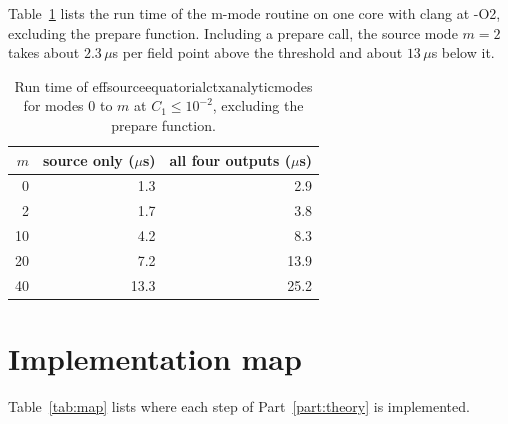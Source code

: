 \documentclass[11pt]{article}
\newcommand{\codeus}{\textunderscore\allowbreak}
\newcommand{\codehy}{-\allowbreak}
\newcommand{\code}[1]{{\ttfamily\let\_\codeus\let\-\codehy #1}}
\begin{document}
Table~\ref{tab:timing} lists the run time of the m-mode routine on one core
with clang at \code{-O2}, excluding the prepare function. Including a prepare
call, the source mode $m=2$ takes about $2.3\,\mu$s per field point above the
threshold and about $13\,\mu$s below it.

\begin{table}[H]
  \centering
  \caption{Run time of \code{effsource\_equatorial\_ctx\_analytic\_modes} for
    modes $0$ to $m$ at $C_1\le10^{-2}$, excluding the prepare function.}
  \label{tab:timing}
  \begin{tabular}{rrr}
    \toprule
    $m$ & source only ($\mu$s) & all four outputs ($\mu$s) \\
    \midrule
    0  & 1.3  & 2.9  \\
    2  & 1.7  & 3.8  \\
    10 & 4.2  & 8.3  \\
    20 & 7.2  & 13.9 \\
    40 & 13.3 & 25.2 \\
    \bottomrule
  \end{tabular}
\end{table}

\section{Implementation map}
\label{sec:map}

Table~\ref{tab:map} lists where each step of Part~\ref{part:theory} is
implemented.
\end{document}
